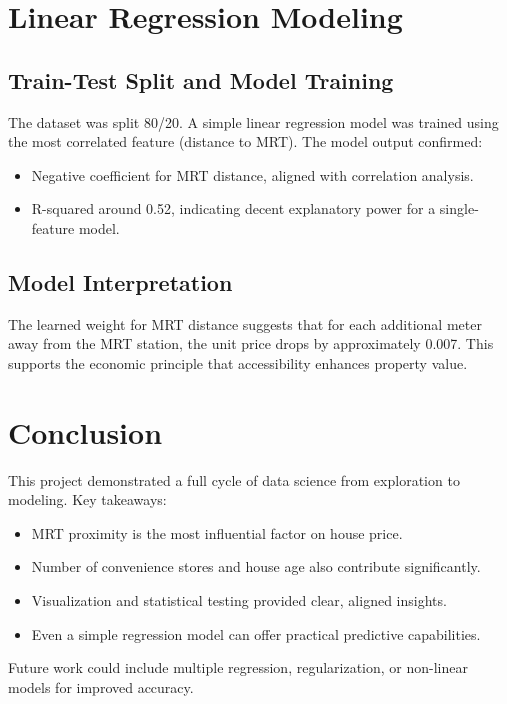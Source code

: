 \documentclass[12pt]{article}
\begin{document}
\section{Linear Regression Modeling}

\subsection{Train-Test Split and Model Training}
The dataset was split 80/20. A simple linear regression model was trained using the most correlated feature (distance to MRT). The model output confirmed:
\begin{itemize}
    \item Negative coefficient for MRT distance, aligned with correlation analysis.
    \item R-squared around 0.52, indicating decent explanatory power for a single-feature model.
\end{itemize}

\subsection{Model Interpretation}
The learned weight for MRT distance suggests that for each additional meter away from the MRT station, the unit price drops by approximately 0.007. This supports the economic principle that accessibility enhances property value.

\section{Conclusion}
This project demonstrated a full cycle of data science from exploration to modeling. Key takeaways:
\begin{itemize}
    \item MRT proximity is the most influential factor on house price.
    \item Number of convenience stores and house age also contribute significantly.
    \item Visualization and statistical testing provided clear, aligned insights.
    \item Even a simple regression model can offer practical predictive capabilities.
\end{itemize}

Future work could include multiple regression, regularization, or non-linear models for improved accuracy.
\end{document}
